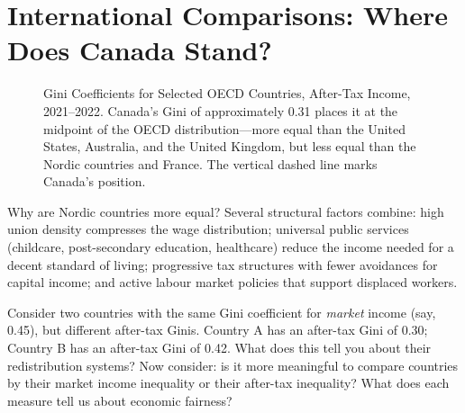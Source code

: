 \section{International Comparisons: Where Does Canada Stand?}

\begin{figure}[H]
\centering
{}
\caption{Gini Coefficients for Selected OECD Countries, After-Tax Income, 2021--2022.
  Canada's Gini of approximately 0.31 places it at the midpoint of the OECD distribution---more
  equal than the United States, Australia, and the United Kingdom, but less equal than
  the Nordic countries and France. The vertical dashed line marks Canada's position.}
\label{fig:gini_oecd}
\end{figure}

Why are Nordic countries more equal? Several structural factors combine: high union density compresses the wage distribution; universal public services (childcare, post-secondary education, healthcare) reduce the income needed for a decent standard of living; progressive tax structures with fewer avoidances for capital income; and active labour market policies that support displaced workers.

\begin{thinkbox}
Consider two countries with the same Gini coefficient for \textit{market} income (say, 0.45), but different after-tax Ginis. Country A has an after-tax Gini of 0.30; Country B has an after-tax Gini of 0.42. What does this tell you about their redistribution systems? Now consider: is it more meaningful to compare countries by their market income inequality or their after-tax inequality? What does each measure tell us about economic fairness?
\end{thinkbox}

